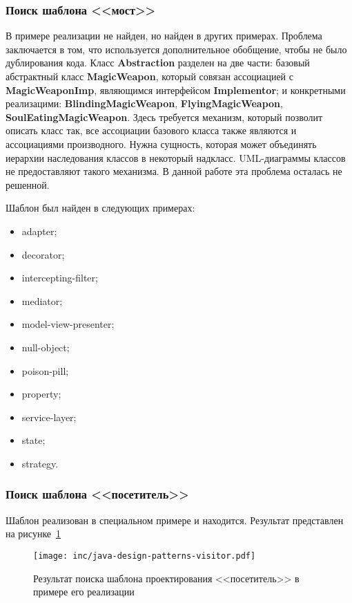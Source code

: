 \subsubsection*{Поиск шаблона <<мост>>}

В примере реализации не найден, но найден в других примерах.
Проблема заключается в том, что используется дополнительное обобщение,
чтобы не было дублирования кода.
Класс \textbf{Abstraction} разделен на две части: базовый абстрактный класс
\textbf{MagicWeapon},
который совязан ассоциацией с \textbf{MagicWeaponImp},
являющимся интерфейсом \textbf{Implementor};
и конкретными реализацими: \textbf{BlindingMagicWeapon},
\textbf{FlyingMagicWeapon}, \textbf{SoulEatingMagicWeapon}.
Здесь требуется механизм, который позволит описать класс так,
все ассоциации базового класса также являются и ассоциациями производного.
Нужна сущность, которая может объединять иерархии наследования классов в
некоторый надкласс.
UML-диаграммы классов не предоставляют такого механизма.
В данной работе эта проблема осталась не решенной.

Шаблон был найден в следующих примерах:
\begin{itemize}
\item adapter;
\item decorator;
\item intercepting-filter;
\item mediator;
\item model-view-presenter;
\item null-object;
\item poison-pill;
\item property;
\item service-layer;
\item state;
\item strategy.
\end{itemize}

\subsubsection*{Поиск шаблона <<посетитель>>}

Шаблон реализован в специальном примере и находится.
Результат представлен на рисунке~\ref{fig:java-design-patterns-visitor}

\begin{figure}[!ht]
\centering
\texttt{[image: inc/java-design-patterns-visitor.pdf]}
\caption{Результат поиска шаблона проектирования <<посетитель>> в примере его реализации}
\label{fig:java-design-patterns-visitor}
\end{figure}


